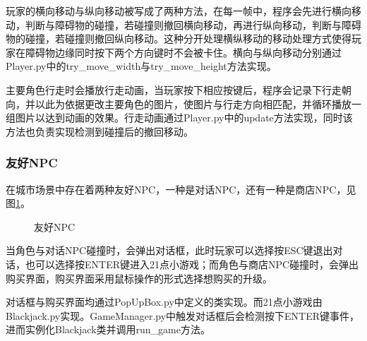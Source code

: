 \documentclass{ctexart}
\begin{document}
玩家的横向移动与纵向移动被写成了两种方法，在每一帧中，程序会先进行横向移动，判断与障碍物的碰撞，若碰撞则撤回横向移动，再进行纵向移动，判断与障碍物的碰撞，若碰撞则撤回纵向移动。这种分开处理横纵移动的移动处理方式使得玩家在障碍物边缘同时按下两个方向键时不会被卡住。横向与纵向移动分别通过Player.py中的try\_move\_width与try\_move\_height方法实现。

主要角色行走时会播放行走动画，当玩家按下相应按键后，程序会记录下行走朝向，并以此为依据更改主要角色的图片，使图片与行走方向相匹配，并循环播放一组图片以达到动画的效果。行走动画通过Player.py中的update方法实现，同时该方法也负责实现检测到碰撞后的撤回移动。

\subsubsection{友好NPC}
在城市场景中存在着两种友好NPC，一种是对话NPC，还有一种是商店NPC，见图\ref{fig:友好NPC}。
\begin{figure}[h]
\centering
{}
\caption{\label{fig:友好NPC}友好NPC}
\end{figure}

当角色与对话NPC碰撞时，会弹出对话框，此时玩家可以选择按ESC键退出对话，也可以选择按ENTER键进入21点小游戏；而角色与商店NPC碰撞时，会弹出购买界面，购买界面采用鼠标操作的形式选择想购买的升级。

对话框与购买界面均通过PopUpBox.py中定义的类实现。而21点小游戏由Blackjack.py实现。GameManager.py中触发对话框后会检测按下ENTER键事件，进而实例化Blackjack类并调用run\_game方法。
\end{document}
